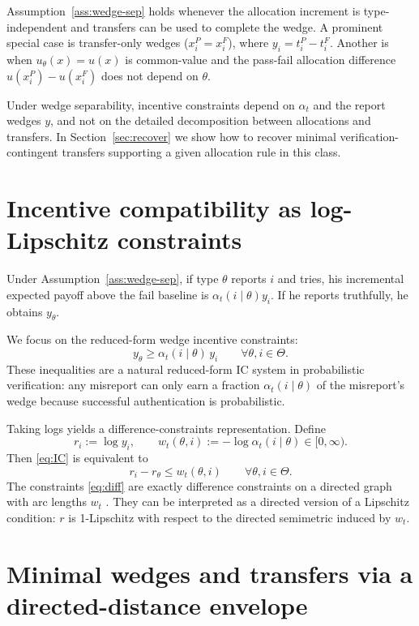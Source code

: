 \documentclass[final,3p,times]{elsarticle}
\theoremstyle{plain}
\theoremstyle{definition}
\newcommand{\1}{\mathbbm{1}}
\newcommand{\ThetaSet}{\Theta}
\begin{document}
Assumption~\ref{ass:wedge-sep} holds whenever the allocation increment is type-independent and transfers can be used to complete the wedge. A prominent special case is transfer-only wedges ($x_i^P=x_i^F$), where $y_i=t_i^P-t_i^F$. Another is when $u_\theta(x)=u(x)$ is common-value and the pass-fail allocation difference $u(x_i^P)-u(x_i^F)$ does not depend on $\theta$. 

Under wedge separability, incentive constraints depend on $\alpha_t$ and the report wedges $y$, and not on the detailed decomposition between allocations and transfers. In Section~\ref{sec:recover} we show how to recover minimal verification-contingent transfers supporting a given allocation rule in this class.

\section{Incentive compatibility as log-Lipschitz constraints}

Under Assumption~\ref{ass:wedge-sep}, if type $\theta$ reports $i$ and tries, his incremental expected payoff above the fail baseline is $\alpha_t(i\mid\theta)y_i$. If he reports truthfully, he obtains $y_\theta$. 

We focus on the reduced-form wedge incentive constraints:
\begin{equation}\label{eq:IC}
y_\theta \ge \alpha_t(i\mid\theta)\,y_i\qquad \forall \theta,i\in\ThetaSet.
\end{equation}
These inequalities are a natural reduced-form IC system in probabilistic verification: any misreport can only earn a fraction $\alpha_t(i\mid\theta)$ of the misreport's wedge because successful authentication is probabilistic.

Taking logs yields a difference-constraints representation. Define
\[
r_i:=\log y_i,\qquad w_t(\theta,i):=-\log \alpha_t(i\mid\theta)\in[0,\infty).
\]
Then \eqref{eq:IC} is equivalent to 
\begin{equation}\label{eq:diff}
r_i - r_\theta \le w_t(\theta,i)\qquad \forall \theta,i\in\ThetaSet.
\end{equation}
The constraints \eqref{eq:diff} are exactly difference constraints on a directed graph with arc lengths $w_t$ \citep[Ch.~24]{CLRS2009}. They can be interpreted as a directed version of a Lipschitz condition: $r$ is 1-Lipschitz with respect to the directed semimetric induced by $w_t$.

\section{Minimal wedges and transfers via a directed-distance envelope}\label{sec:envelope}
\end{document}

